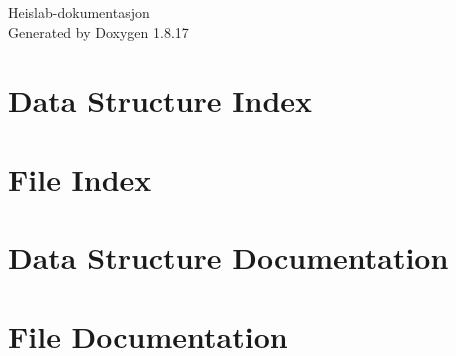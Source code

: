 \let\mypdfximage\pdfximage\def\pdfximage{\immediate\mypdfximage}\documentclass[twoside]{book}
\newcommand{\+}{\discretionary{\mbox{\scriptsize$\hookleftarrow$}}{}{}}
\newcommand{\clearemptydoublepage}{%
  \newpage{\pagestyle{empty}\cleardoublepage}%
}
\begin{document}
\hypersetup{pageanchor=false,
             bookmarksnumbered=true,
             pdfencoding=unicode
            }
\begin{titlepage}
\vspace*{7cm}
\begin{center}%
{\Large Heislab-\/dokumentasjon }\\
\vspace*{1cm}
{\large Generated by Doxygen 1.8.17}\\
\end{center}
\end{titlepage}
\clearemptydoublepage
{}
\tableofcontents
\clearemptydoublepage
{}
\hypersetup{pageanchor=true}

\chapter{Data Structure Index}

\chapter{File Index}

\chapter{Data Structure Documentation}


\chapter{File Documentation}










\backmatter
\newpage
{}
\clearemptydoublepage
{}
\printindex
\end{document}
